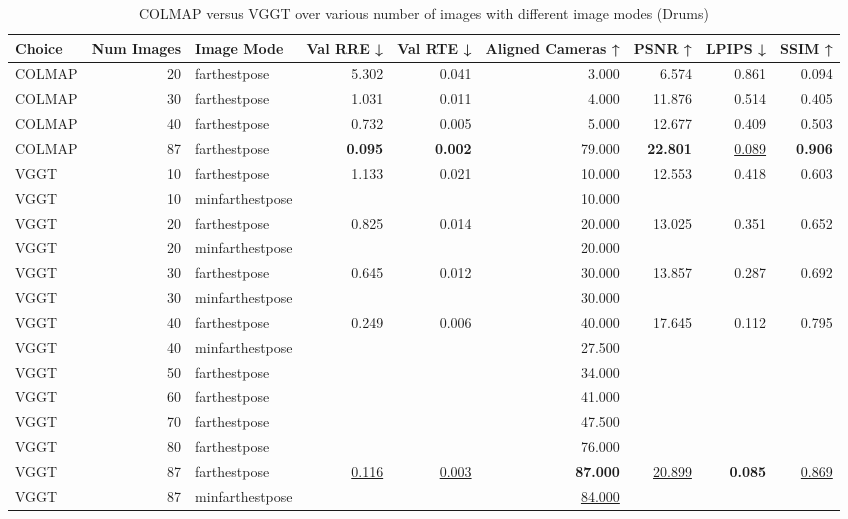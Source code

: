 \begin{table}[H]
\caption{COLMAP versus VGGT over various number of images with different image modes (Drums)}
\label{tab:01_num_images_image_mode_drums}
\centering
\scriptsize
\begin{tabular}{lrlrrrrrr}
\toprule
Choice & Num Images & Image Mode & Val RRE ↓ & Val RTE ↓ & Aligned Cameras ↑ & PSNR ↑ & LPIPS ↓ & SSIM ↑ \\
\midrule
COLMAP & 20 & farthestpose & 5.302 & 0.041 & 3.000 & 6.574 & 0.861 & 0.094 \\
COLMAP & 30 & farthestpose & 1.031 & 0.011 & 4.000 & 11.876 & 0.514 & 0.405 \\
COLMAP & 40 & farthestpose & 0.732 & 0.005 & 5.000 & 12.677 & 0.409 & 0.503 \\
COLMAP & 87 & farthestpose & \textbf{0.095} & \textbf{0.002} & 79.000 & \textbf{22.801} & \underline{0.089} & \textbf{0.906} \\
VGGT & 10 & farthestpose & 1.133 & 0.021 & 10.000 & 12.553 & 0.418 & 0.603 \\
VGGT & 10 & minfarthestpose &  &  & 10.000 &  &  &  \\
VGGT & 20 & farthestpose & 0.825 & 0.014 & 20.000 & 13.025 & 0.351 & 0.652 \\
VGGT & 20 & minfarthestpose &  &  & 20.000 &  &  &  \\
VGGT & 30 & farthestpose & 0.645 & 0.012 & 30.000 & 13.857 & 0.287 & 0.692 \\
VGGT & 30 & minfarthestpose &  &  & 30.000 &  &  &  \\
VGGT & 40 & farthestpose & 0.249 & 0.006 & 40.000 & 17.645 & 0.112 & 0.795 \\
VGGT & 40 & minfarthestpose &  &  & 27.500 &  &  &  \\
VGGT & 50 & farthestpose &  &  & 34.000 &  &  &  \\
VGGT & 60 & farthestpose &  &  & 41.000 &  &  &  \\
VGGT & 70 & farthestpose &  &  & 47.500 &  &  &  \\
VGGT & 80 & farthestpose &  &  & 76.000 &  &  &  \\
VGGT & 87 & farthestpose & \underline{0.116} & \underline{0.003} & \textbf{87.000} & \underline{20.899} & \textbf{0.085} & \underline{0.869} \\
VGGT & 87 & minfarthestpose &  &  & \underline{84.000} &  &  &  \\
\bottomrule
\end{tabular}
\end{table}